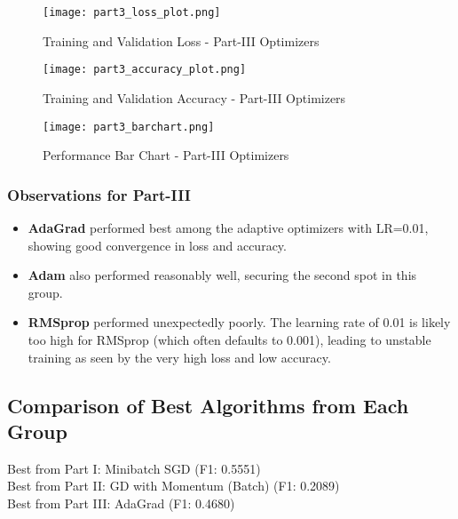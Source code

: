 \documentclass[11pt,a4paper]{article}
\begin{document}
\begin{figure}[H]
    \centering
    \texttt{[image: part3\_loss\_plot.png]} %
    \caption{Training and Validation Loss - Part-III Optimizers}
    \label{fig:part3_loss}
\end{figure}
\begin{figure}[H]
    \centering
    \texttt{[image: part3\_accuracy\_plot.png]} %
    \caption{Training and Validation Accuracy - Part-III Optimizers}
    \label{fig:part3_accuracy}
\end{figure}
\begin{figure}[H]
    \centering
    \texttt{[image: part3\_barchart.png]} %
    \caption{Performance Bar Chart - Part-III Optimizers}
    \label{fig:part3_barchart}
\end{figure}
\clearpage

\subsubsection{Observations for Part-III}
\begin{itemize}
    \item \textbf{AdaGrad} performed best among the adaptive optimizers with LR=0.01, showing good convergence in loss and accuracy.
    \item \textbf{Adam} also performed reasonably well, securing the second spot in this group.
    \item \textbf{RMSprop} performed unexpectedly poorly. The learning rate of 0.01 is likely too high for RMSprop (which often defaults to 0.001), leading to unstable training as seen by the very high loss and low accuracy.
\end{itemize}

\subsection{Comparison of Best Algorithms from Each Group}
Best from Part I: Minibatch SGD (F1: 0.5551) \\
Best from Part II: GD with Momentum (Batch) (F1: 0.2089) \\
Best from Part III: AdaGrad (F1: 0.4680)
\end{document}
